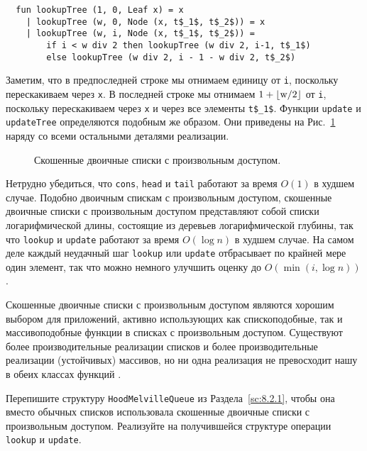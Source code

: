 \begin{frame}[fragile]{}
\begin{lstlisting}
  fun lookupTree (1, 0, Leaf x) = x
    | lookupTree (w, 0, Node (x, t$_1$, t$_2$)) = x
    | lookupTree (w, i, Node (x, t$_1$, t$_2$)) =
        if i < w div 2 then lookupTree (w div 2, i-1, t$_1$)
        else lookupTree (w div 2, i - 1 - w div 2, t$_2$)
\end{lstlisting}
Заметим, что в предпоследней строке мы отнимаем единицу от \lstinline!i!,
поскольку перескакиваем через \lstinline!x!. В последней строке мы
отнимаем $1 + \lfloor \lstinline!w!/2 \rfloor$ от \lstinline!i!,
поскольку перескакиваем через \lstinline!x! и через все элементы
\lstinline!t$_1$!. Функции \lstinline!update! и \lstinline!updateTree!
определяются подобным же образом. Они приведены на Рис.~\ref{fig:9.7}
наряду со всеми остальными деталями реализации.

\begin{figure}
  \centering

  \caption{Скошенные двоичные списки с произвольным доступом.}
  \label{fig:9.7}
\end{figure}

\end{frame}

\begin{frame}[fragile]{}

Нетрудно убедиться, что \lstinline!cons!, \lstinline!head! и
\lstinline!tail! работают за время $O(1)$ в худшем случае. Подобно
двоичным спискам с произвольным доступом, скошенные двоичные списки с
произвольным доступом представляют собой списки логарифмической длины,
состоящие из деревьев логарифмической глубины, так что
\lstinline!lookup! и \lstinline!update! работают за время $O(\log n)$
в худшем случае. На самом деле каждый неудачный шаг \lstinline!lookup!
или \lstinline!update! отбрасывает по крайней мере один элемент, так
что можно немного улучшить оценку до $O(\min(i, \log n))$.

\begin{hint}
  Скошенные двоичные списки с произвольным доступом являются хорошим
  выбором для приложений, активно использующих как спископодобные, так
  и массивоподобные функции в списках с произвольным
  доступом. Существуют более производительные реализации списков и
  более производительные реализации (устойчивых) массивов, но ни одна
  реализация не превосходит нашу в обеих классах функций \cite{Okasaki1995b}.
\end{hint}

\begin{exercise}\label{ex:9.14}
  Перепишите структуру \lstinline!HoodMelvilleQueue! из
  Раздела~\ref{sc:8.2.1}, чтобы она вместо обычных списков
  использовала скошенные двоичные списки с произвольным
  доступом. Реализуйте на получившейся структуре операции
  \lstinline!lookup! и \lstinline!update!.
\end{exercise}

\end{frame}

